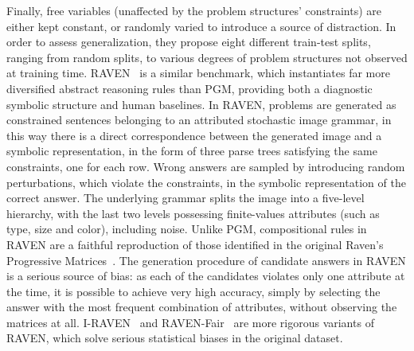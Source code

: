 Finally, free variables (unaffected by the problem structures' constraints) are either kept constant, or randomly varied to introduce a source of distraction.
In order to assess generalization, they propose eight different train-test splits, ranging from random splits, to various degrees of problem structures not observed at training time.
%
RAVEN~\cite{zhang2019raven} is a similar benchmark, which instantiates far more diversified abstract reasoning rules than PGM, providing both a diagnostic symbolic structure %
and human baselines.
In RAVEN, problems are generated as constrained sentences belonging to an attributed stochastic image grammar, in this way there is a direct correspondence between the generated image and a symbolic representation, in the form of three parse trees satisfying the same constraints, one for each row. 
Wrong answers are sampled by introducing random perturbations, which violate the constraints, in the symbolic representation of the correct answer.
The underlying grammar splits the image into a five-level hierarchy, with the last two levels possessing finite-values attributes (such as type, size and color), including noise.
Unlike PGM, compositional rules in RAVEN are a faithful reproduction of those identified in the original Raven's Progressive Matrices~\cite{carpenter1990one}.
The generation procedure of candidate answers in RAVEN is a serious source of bias: as each of the candidates violates only one attribute at the time, it is possible to achieve very high accuracy, simply by selecting the answer with the most frequent combination of attributes, without observing the matrices at all. 
I-RAVEN~\cite{hu2021stratified} and RAVEN-Fair~\cite{benny2021scale} are more rigorous variants of RAVEN, which solve serious statistical biases in the original dataset.

